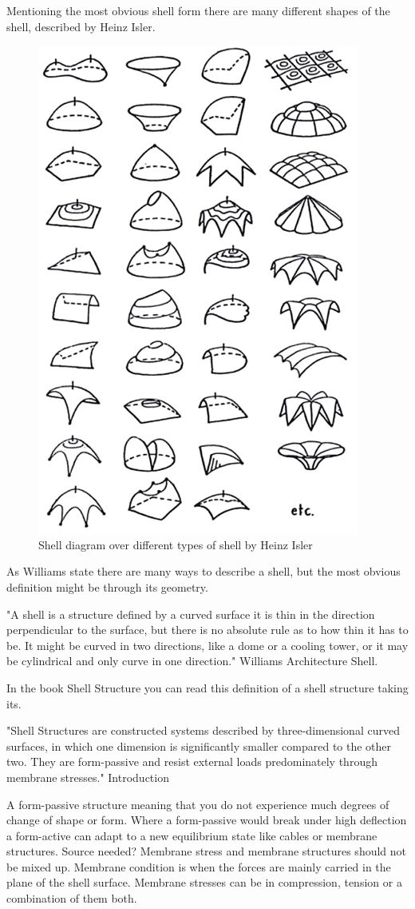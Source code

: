 Mentioning the most obvious shell form there are many different shapes of the shell, described by Heinz Isler.

\begin{figure}[H]
\centering
\includegraphics[width=0.6\linewidth ]{figure/Introduction/ShellDiagram.jpg}
\caption{Shell diagram over different types of shell by Heinz Isler}
\end{figure}

As Williams state there are many ways to describe a shell, but the most obvious definition might be through its geometry.

"A shell is a structure defined by a curved surface it is thin in the direction perpendicular to the surface, but there is no absolute rule as to how thin it has to be. It might be curved in two directions, like a dome or a cooling tower, or it may be cylindrical and only curve in one direction." Williams Architecture Shell.

In the book Shell Structure you can read this definition of a shell structure taking its.

"Shell Structures are constructed systems described by three-dimensional curved surfaces, in which one dimension is significantly smaller compared to the other two. They are form-passive and resist external loads predominately through membrane stresses." Introduction 

A form-passive structure meaning that you do not experience much degrees of change of shape or form. Where a form-passive would break under high deflection a form-active can adapt to a new equilibrium state like cables or membrane structures. Source needed? 
Membrane stress and membrane structures should not be mixed up. Membrane condition is when the forces are mainly carried in the plane of the shell surface. Membrane stresses can be in compression, tension or a combination of them both. \\



